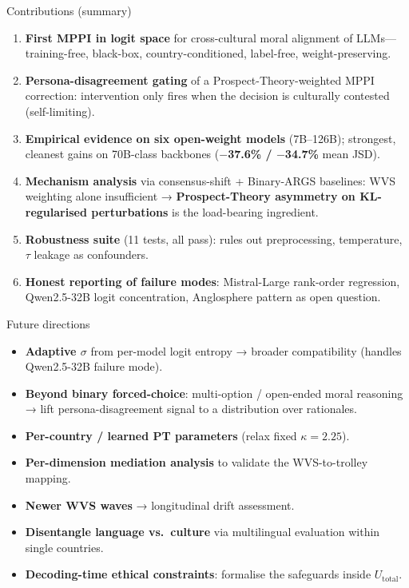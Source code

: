 \documentclass[10pt,aspectratio=169]{beamer}
\begin{document}
\begin{frame}{Contributions (summary)}
  \begin{enumerate}
    \item \textbf{First MPPI in logit space} for cross-cultural moral alignment of LLMs—training-free, black-box, country-conditioned, label-free, weight-preserving.
    \item \textbf{Persona-disagreement gating} of a Prospect-Theory-weighted MPPI correction: intervention only fires when the decision is culturally contested (self-limiting).
    \item \textbf{Empirical evidence on six open-weight models} (7B--126B); strongest, cleanest gains on 70B-class backbones (\textbf{$-$37.6\% / $-$34.7\%} mean JSD).
    \item \textbf{Mechanism analysis} via consensus-shift + Binary-ARGS baselines: WVS weighting alone insufficient → \textbf{Prospect-Theory asymmetry on KL-regularised perturbations} is the load-bearing ingredient.
    \item \textbf{Robustness suite} (11 tests, all pass): rules out preprocessing, temperature, $\tau$ leakage as confounders.
    \item \textbf{Honest reporting of failure modes}: Mistral-Large rank-order regression, Qwen2.5-32B logit concentration, Anglosphere pattern as open question.
  \end{enumerate}
\end{frame}

\begin{frame}{Future directions}
  \begin{itemize}
    \item \textbf{Adaptive $\sigma$} from per-model logit entropy → broader compatibility (handles Qwen2.5-32B failure mode).
    \item \textbf{Beyond binary forced-choice}: multi-option / open-ended moral reasoning → lift persona-disagreement signal to a distribution over rationales.
    \item \textbf{Per-country / learned PT parameters} (relax fixed $\kappa=2.25$).
    \item \textbf{Per-dimension mediation analysis} to validate the WVS-to-trolley mapping.
    \item \textbf{Newer WVS waves} → longitudinal drift assessment.
    \item \textbf{Disentangle language vs.\ culture} via multilingual evaluation within single countries.
    \item \textbf{Decoding-time ethical constraints}: formalise the safeguards inside $U_\text{total}$.
  \end{itemize}
\end{frame}
\end{document}
